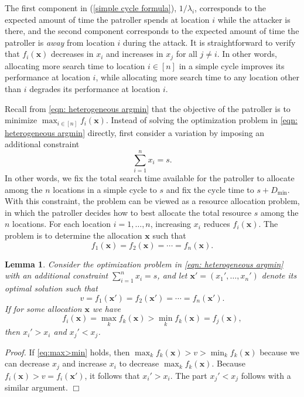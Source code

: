 \documentclass[11pt,a4paper]{article}
\newtheorem{lem}[theorem]{Lemma}
\begin{document}
The first component in (\ref{simple cycle formula}), $1/\lambda_i$, corresponds to the expected amount of time the patroller spends at location $i$ while the attacker is there, and the second component corresponds to the expected amount of time the patroller is \textit{away} from location $i$ during the attack.
It is straightforward to verify that $f_i(\mathbf{x})$ decreases in $x_i$ and increases in $x_j$ for all $j \neq i$.
In other words, allocating more search time to location $i \in [n]$ in a simple cycle improves its performance at location $i$, while allocating more search time to any location other than $i$ degrades its performance at location $i$.

Recall from \eqref{eqn: heterogeneous argmin} that the objective of the patroller is to minimize $\max_{i \in [n]} f_i(\mathbf{x})$.
Instead of solving the optimization problem in \eqref{eqn: heterogeneous argmin} directly, first consider a variation by imposing an additional constraint
\[
\sum_{i=1}^n x_i = s.
\]
In other words, we fix the total search time available for the patroller to allocate among the $n$ locations in a simple cycle to $s$ and fix the cycle time to $s + D_{\min}$.
With this constraint, the problem can be viewed as a resource allocation problem, in which the patroller decides how to best allocate the total resource $s$ among the $n$ locations.
For each location $i=1,\ldots,n$, increasing $x_i$ reduces $f_i(\mathbf{x})$.
The problem is to determine the allocation $\mathbf{x}$ such that
\begin{equation}
f_1(\mathbf{x}) = f_2(\mathbf{x}) = \cdots = f_n(\mathbf{x}).
\label{eq:f1=f2}
\end{equation}


\begin{lem}
\label{le:sum=s}
Consider the optimization problem in \eqref{eqn: heterogeneous argmin} with an additional constraint $\sum_{i=1}^n x_i = s$, and let $\mathbf{x}' = (x_1',\ldots, x_n')$ denote its optimal solution such that
\[
v = f_1(\mathbf{x}') = f_2(\mathbf{x}') = \cdots = f_n(\mathbf{x}').
\]
If for some allocation $\mathbf{x}$ we have 
\begin{equation}
f_i(\mathbf{x}) = \max_k f_k(\mathbf{x}) >  \min_k f_k(\mathbf{x}) = f_j(\mathbf{x}),
\label{eq:max>min}
\end{equation}
then $x_i' > x_i$ and $x_j' < x_j$.
\end{lem}
\noindent
\textit{Proof.}
If \eqref{eq:max>min} holds, then $\max_k f_k(\mathbf{x}) > v > \min_k f_k(\mathbf{x})$ because we can decrease $x_j$ and increase $x_i$ to decrease $\max_k f_k (\mathbf{x})$.
Because $f_i(\mathbf{x}) > v = f_i(\mathbf{x}')$, it follows that $x_i' > x_i$.
The part $x_j' < x_j$ follows with a similar argument.
\hfill $\Box$
\end{document}

